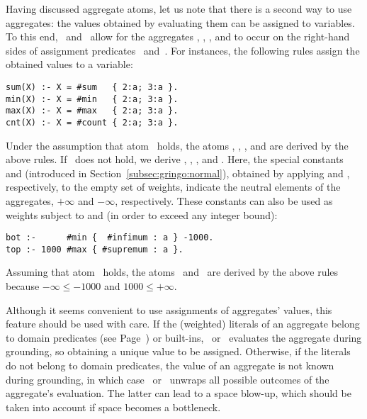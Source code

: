 Having discussed aggregate atoms,
let us note that there is a second way to use aggregates:
the values obtained by evaluating them can be assigned to variables.
To this end, \gringo\ and \clingo\ allow for the aggregates
, , , and  to
occur on the right-hand sides of assignment predicates~\code{=} and~\code{:=}.
%
%
For instances, the following rules assign the obtained values to a variable:
\begin{lstlisting}[numbers=none]
sum(X) :- X = #sum   { 2:a; 3:a }.
min(X) :- X = #min   { 2:a; 3:a }.
max(X) :- X = #max   { 2:a; 3:a }.
cnt(X) :- X = #count { 2:a; 3:a }.
\end{lstlisting}
Under the assumption that atom~ holds,
the atoms , ,
, and  are
derived by the above rules.
If~ does not hold, we derive 
, ,
, and .
Here, the special constants  and 
(introduced in Section~\ref{subsec:gringo:normal}),
obtained by applying  and , respectively,
to the empty set of weights,
indicate the neutral elements of the aggregates,
$+\infty$ and $-\infty$, respectively.
These constants can also be used as weights subject to 
 and  (in order to exceed any integer bound):
\begin{lstlisting}[numbers=none]
bot :-      #min {  #infimum : a } -1000.
top :- 1000 #max { #supremum : a }.
\end{lstlisting}
Assuming that atom~ holds,
the atoms~ and~ are derived by the above rules
because $-\infty\leq-1000$ and $1000\leq+\infty$.

Although it seems convenient to use assignments of aggregates' values,
this feature should be used with care.
If the (weighted) literals of an aggregate belong to domain predicates
(see Page~\pageref{pg:domain}) or built-ins,
\gringo\ or \clingo\ evaluates the aggregate during grounding, so obtaining
a unique value to be assigned.
%
%
Otherwise, if the literals do not belong to domain predicates,
the value of an aggregate is not known during grounding,
in which case \gringo\ or \clingo\ unwraps all possible outcomes of the
aggregate's evaluation.
The latter can lead to a space blow-up, which should be taken into account
if space becomes a bottleneck.

